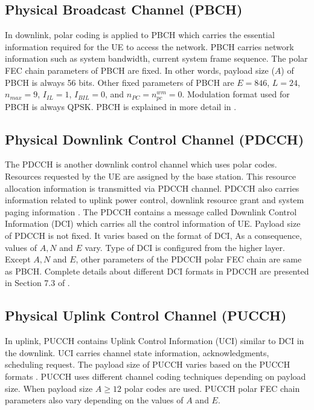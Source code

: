 \subsection{Physical Broadcast Channel (PBCH)}
In downlink, polar coding is applied to PBCH which carries the essential information required for the UE to access the network. PBCH carries network information such as system bandwidth, current system frame sequence. The polar FEC chain parameters of PBCH are fixed. In other words, payload size ($A$) of PBCH is always 56 bits. Other fixed parameters of PBCH are $E = 846$, $L = 24$, $n_{max} = 9$, $I_{IL} = 1$, $I_{BIL} = 0$, and $n_{PC} = n_{pc}^{wm} = 0$. Modulation format used for PBCH is always QPSK. PBCH is explained in more detail in \cite{3gpp.38.212}.

\subsection{Physical Downlink Control Channel (PDCCH)}
The PDCCH is another downlink control channel which uses polar codes. Resources requested by the UE are assigned by the base station. This resource allocation information is transmitted via PDCCH channel. PDCCH also carries information related to uplink power control, downlink resource grant and system paging information \cite{3gpp.38.211}. The PDCCH contains a message called Downlink Control Information (DCI) which carries all the control information of UE. Payload size of PDCCH is not fixed. It varies based on the format of DCI, As a consequence, values of $A, N$ and $E$ vary. Type of DCI is configured from the higher layer. Except $A, N$ and $E$, other parameters of the PDCCH polar FEC chain are same as PBCH. Complete details about different DCI formats in PDCCH are presented in Section 7.3 of \cite{3gpp.38.212}.

\subsection{Physical Uplink Control Channel (PUCCH)}
In uplink, PUCCH contains Uplink Control Information (UCI) similar to DCI in the downlink. UCI carries channel state information, acknowledgments, scheduling request. The payload size of PUCCH varies based on the PUCCH formats \cite{3gpp.38.211}. PUCCH uses different channel coding techniques depending on payload size. When payload size $A \geq 12$ polar codes are used. PUCCH polar FEC chain parameters also vary depending on the values of $A$ and $E$. \newline

